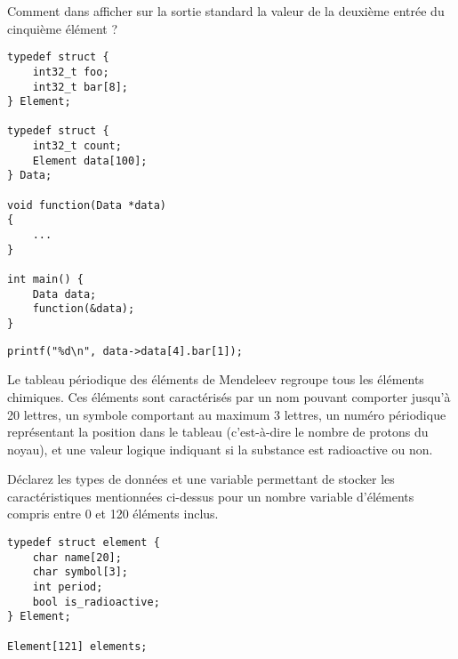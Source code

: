 \documentclass[french,a4paper,addpoints,11pt]{exam}
\begin{document}
\begin{questions}

\question Comment dans  afficher sur la sortie standard la valeur de la deuxième entrée  du cinquième élément ?

\begin{multicols}{2}
\begin{lstlisting}
typedef struct {
    int32_t foo;
    int32_t bar[8];
} Element;

typedef struct {
    int32_t count;
    Element data[100];
} Data;

void function(Data *data)
{
    ...
}

int main() {
    Data data;
    function(&data);
}
\end{lstlisting}
\end{multicols}

\ifprintanswers
\begin{solution}
\begin{lstlisting}
printf("%d\n", data->data[4].bar[1]);
\end{lstlisting}
\end{solution}
\fi
\question
Le tableau périodique des éléments de Mendeleev regroupe tous les éléments chimiques. Ces éléments sont caractérisés par un nom pouvant comporter jusqu'à 20 lettres, un symbole comportant au maximum 3 lettres, un numéro périodique représentant la position dans le tableau (c'est-à-dire le nombre de protons du noyau), et une valeur logique indiquant si la substance est radioactive ou non.

Déclarez les types de données et une variable permettant de stocker les caractéristiques mentionnées ci-dessus pour un nombre variable d'éléments compris entre 0 et 120 éléments inclus.

\ifprintanswers
\begin{solution}
\begin{lstlisting}
typedef struct element {
    char name[20];
    char symbol[3];
    int period;
    bool is_radioactive;
} Element;

Element[121] elements;
\end{lstlisting}
\end{solution}
\fi
\end{questions}
\end{document}
